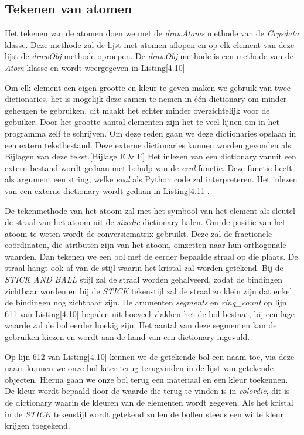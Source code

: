 \subsection{Tekenen van atomen}

Het tekenen van de atomen doen we met de \textit{drawAtoms} methode van de \textit{Crysdata} klasse. Deze methode zal de lijst met atomen aflopen en op elk element van deze lijst de \textit{drawObj} methode oproepen. De \textit{drawObj} methode is een methode van de \textit{Atom} klasse en wordt weergegeven in Listing[4.10] 



Om elk element een eigen grootte en kleur te geven maken we gebruik van twee dictionaries, het is mogelijk deze samen te nemen in één dictionary om minder geheugen te gebruiken, dit maakt het echter minder overzichtelijk voor de gebuiker. Door het grootte aantal elementen zijn het te veel lijnen om in het programma zelf te schrijven. Om deze reden gaan we deze dictionaries opslaan in een extern tekstbestand. Deze externe dictionaries kunnen worden gevonden als Bijlagen van deze tekst.[Bijlage E \& F] Het inlezen van een dictionary vanuit een extern bestand wordt gedaan met behulp van de \textit{eval} functie. Deze functie heeft als argument een string, welke \textit{eval} als Python code zal interpreteren. Het inlezen van een externe dictionary wordt gedaan in Listing[4.11]. 
  


De tekenmethode van het atoom zal met het symbool van het element als sleutel de straal van het atoom uit de \textit{sizedic} dictionary halen. Om de positie van het atoom te weten wordt de conversiematrix gebruikt. Deze zal de fractionele coördinaten, die atributen zijn van het atoom, omzetten naar hun orthogonale waarden. Dan tekenen we een bol met de eerder bepaalde straal op die plaats. De straal hangt ook af van de stijl waarin het kristal zal worden getekend. Bij de \textit{STICK AND BALL} stijl zal de straal worden gehalveerd, zodat de bindingen zichtbaar worden en bij de \textit{STICK} tekenstijl zal de straal zo klein zijn dat enkel de bindingen nog zichtbaar zijn. De arumenten \textit{segments} en \textit{ring\_count} op lijn 611 van Listing[4.10] bepalen uit hoeveel vlakken het de bol bestaat, bij een lage waarde zal de bol eerder hoekig zijn. Het aantal van deze segmenten kan de gebruiken kiezen en wordt aan de hand van een dictionary ingevuld.
\par
Op lijn 612 van Listing[4.10] kennen we de getekende bol een naam toe, via deze naam kunnen we onze bol later terug terugvinden in de lijst van getekende objecten. Hierna gaan we onze bol terug een materiaal en een kleur toekennen. De kleur wordt bepaald door de waarde die terug te vinden is in \textit{colordic}, dit is de dictionary waarin de kleuren van de elementen wordt gegeven. Als het kristal in de \textit{STICK} tekenstijl wordt getekend zullen de bollen steeds een witte kleur krijgen toegekend.
\par


